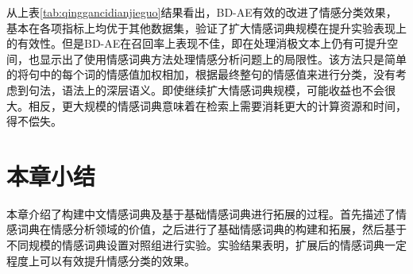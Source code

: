 从上表\ref{tab:qinggancidianjieguo}结果看出，BD-AE有效的改进了情感分类效果，基本在各项指标上均优于其他数据集，验证了扩大情感词典规模在提升实验表现上的有效性。但是BD-AE在召回率上表现不佳，即在处理消极文本上仍有可提升空间，也显示出了使用情感词典方法处理情感分析问题上的局限性。该方法只是简单的将句中的每个词的情感值加权相加，根据最终整句的情感值来进行分类，没有考虑到句法，语法上的深层语义。即使继续扩大情感词典规模，可能收益也不会很大。相反，更大规模的情感词典意味着在检索上需要消耗更大的计算资源和时间，得不偿失。

\section{本章小结}
本章介绍了构建中文情感词典及基于基础情感词典进行拓展的过程。首先描述了情感词典在情感分析领域的价值，之后进行了基础情感词典的构建和拓展，然后基于不同规模的情感词典设置对照组进行实验。实验结果表明，扩展后的情感词典一定程度上可以有效提升情感分类的效果。

